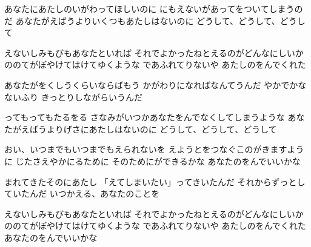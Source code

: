 \documentclass{article}
\newenvironment{Japanese}{%
\CJKfamily{min}%
\CJKtilde
\CJKnospace}{}
\begin{document}
\begin{CJK}{UTF8}{}
\begin{Japanese}
\begin{songs}{}
あなたにあたしのいがわってほしいのに
にもえないがあってをついてしまうのだ
あなたがえばうよりいくつもあたしはないのに
どうして、どうして、どうして

えないしみもびもあなたといれば
それでよかったねとえるのがどんなにしいか
ののてがぼやけてはけてゆくような
であふれてりないや
あたしのをんでくれた

あなたがをくしうくらいならばもう
かがわりになればなんてうんだ
やかでかなないふり
きっとりしながらいうんだ

ってもってもたるをる
さなみがいつかあなたをんでなくしてしまうような
あなたがえばうよりげさにあたしはないのに
どうして、どうして、どうして

おい、いつまでもいつまでもえられないを
えようとをつなぐこのがきますように
じたさえやかにるために
そのためにができるかな
あなたのをんでいいかな

まれてきたそのにあたし
「えてしまいたい」ってきいたんだ
それからずっとしていたんだ
いつかえる、あなたのことを

えないしみもびもあなたといれば
それでよかったねとえるのがどんなにしいか
ののてがぼやけてはけてゆくような
であふれてりないや
あたしのをんでくれた
あなたのをんでいいかな


\end{songs}
\end{Japanese}
\end{CJK}
\end{document}
